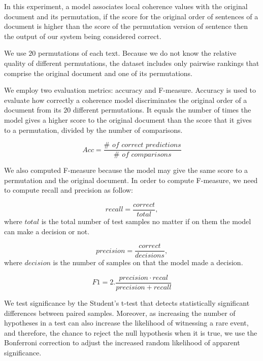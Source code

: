 In this experiment, a model associates local coherence values with the original document and its permutation, if the score for the original order of sentences of a document is higher than the score of the permutation version of sentence then the output of our system being considered correct. 

We use $20$ permutations of each text. 
Because we do not know the relative quality of different permutations, the dataset includes only pairwise rankings that comprise the original document and one of its permutations.

We employ two evaluation metrics: accuracy and F-measure. 
Accuracy is used to evaluate how correctly a coherence model discriminates the original order of a document from its $20$ different permutations.
It equals the number of times the model gives a higher score to the original document than the score that it gives to a permutation, divided by the number of comparisons.

\begin{equation}
Acc  = \frac{\#\textit{ of correct predictions}}{\#\textit{ of comparisons}}
\end{equation}

We also computed F-measure because the model may give the same score to a permutation and the original document. 
In order to compute F-measure, we need to compute recall and precision as follow:

\begin{equation}
recall = \frac{correct}{total},
\end{equation}
where $total$ is the total number of test samples no matter if on them the model can make a decision or not. 

\begin{equation}
precision = \frac{correct}{decisions},
\end{equation}
where $decision$ is the number of samples on that the model made a decision.

\begin{equation}
F1 = 2.\frac{precision \cdot recal}{precision + recall}
\end{equation}


We test significance by the Student’s t-test that detects statistically significant differences between paired samples.
Moreover, as increasing the number of hypotheses in a test can also increase the likelihood of witnessing a rare event, and therefore, the chance to reject the null hypothesis when it is true, we use the Bonferroni correction to adjust the increased
random likelihood of apparent significance. 

